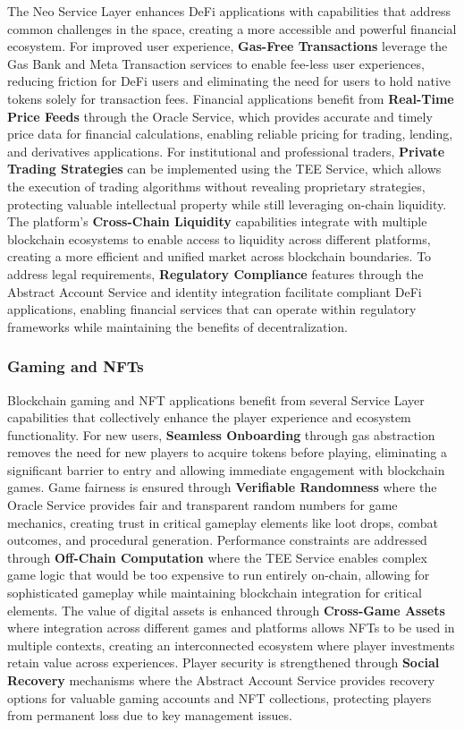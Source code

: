 \documentclass[11pt]{article}
\begin{document}
The Neo Service Layer enhances DeFi applications with capabilities that address common challenges in the space, creating a more accessible and powerful financial ecosystem. For improved user experience, \textbf{Gas-Free Transactions} leverage the Gas Bank and Meta Transaction services to enable fee-less user experiences, reducing friction for DeFi users and eliminating the need for users to hold native tokens solely for transaction fees. Financial applications benefit from \textbf{Real-Time Price Feeds} through the Oracle Service, which provides accurate and timely price data for financial calculations, enabling reliable pricing for trading, lending, and derivatives applications. For institutional and professional traders, \textbf{Private Trading Strategies} can be implemented using the TEE Service, which allows the execution of trading algorithms without revealing proprietary strategies, protecting valuable intellectual property while still leveraging on-chain liquidity. The platform's \textbf{Cross-Chain Liquidity} capabilities integrate with multiple blockchain ecosystems to enable access to liquidity across different platforms, creating a more efficient and unified market across blockchain boundaries. To address legal requirements, \textbf{Regulatory Compliance} features through the Abstract Account Service and identity integration facilitate compliant DeFi applications, enabling financial services that can operate within regulatory frameworks while maintaining the benefits of decentralization.

\subsubsection{Gaming and NFTs}
\label{subsubsec:gaming-nfts}

Blockchain gaming and NFT applications benefit from several Service Layer capabilities that collectively enhance the player experience and ecosystem functionality. For new users, \textbf{Seamless Onboarding} through gas abstraction removes the need for new players to acquire tokens before playing, eliminating a significant barrier to entry and allowing immediate engagement with blockchain games. Game fairness is ensured through \textbf{Verifiable Randomness} where the Oracle Service provides fair and transparent random numbers for game mechanics, creating trust in critical gameplay elements like loot drops, combat outcomes, and procedural generation. Performance constraints are addressed through \textbf{Off-Chain Computation} where the TEE Service enables complex game logic that would be too expensive to run entirely on-chain, allowing for sophisticated gameplay while maintaining blockchain integration for critical elements. The value of digital assets is enhanced through \textbf{Cross-Game Assets} where integration across different games and platforms allows NFTs to be used in multiple contexts, creating an interconnected ecosystem where player investments retain value across experiences. Player security is strengthened through \textbf{Social Recovery} mechanisms where the Abstract Account Service provides recovery options for valuable gaming accounts and NFT collections, protecting players from permanent loss due to key management issues.
\end{document}
